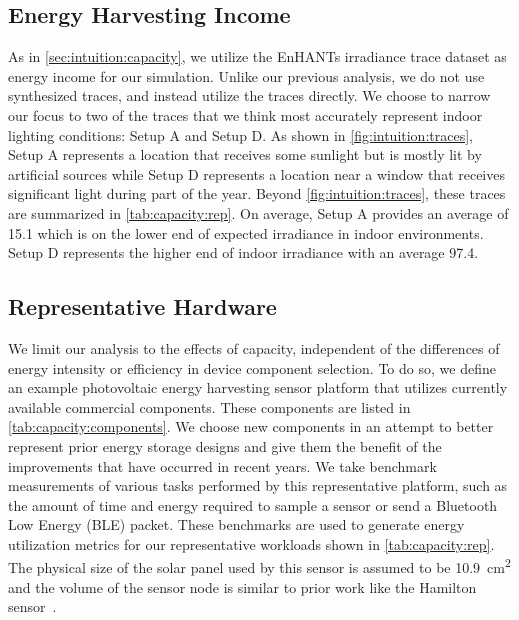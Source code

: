 \subsection{Energy Harvesting Income}
As in \cref{sec:intuition:capacity}, we utilize the EnHANTs irradiance trace dataset as energy income for our simulation.
Unlike our previous analysis, we do not use synthesized traces, and instead utilize the traces directly.
We choose to narrow our focus to two of the traces that we think most accurately represent indoor lighting conditions: Setup A and Setup D.
As shown in \cref{fig:intuition:traces}, Setup A represents a location that receives some sunlight but is mostly lit by artificial sources while Setup D represents a location near a window that receives significant light during part of the year.
Beyond \cref{fig:intuition:traces}, these traces are summarized in \cref{tab:capacity:rep}.
On average, Setup A provides an average of 15.1\ssi[per-mode=symbol]{\micro\watt\per\centi\meter\squared} which is on the lower end of expected irradiance in indoor environments. Setup D represents the higher end of indoor irradiance with an average 97.4\ssi[per-mode=symbol]{\micro\watt\per\centi\meter\squared}.

\subsection{Representative Hardware}
We limit our analysis to the effects of capacity,
independent of the differences of energy intensity or efficiency in device
component selection. To do so, we define an example photovoltaic energy harvesting
sensor platform that utilizes currently available commercial
components. These components are listed in \cref{tab:capacity:components}.
We choose new
components in an attempt to better represent prior energy storage designs and
give them the benefit of the improvements that have occurred in recent years.
We take benchmark
measurements of various tasks performed by this representative platform, such as the
amount of time and energy required to sample a sensor or send a Bluetooth Low
Energy (BLE) packet. 
These benchmarks are used to generate energy utilization metrics
for our representative workloads shown in \cref{tab:capacity:rep}.
The physical size of the solar panel used by this sensor
is assumed to be
10.9~cm\textsuperscript{2} and the volume of the sensor node is similar to prior
work like the Hamilton sensor~\cite{kim2018system}.


